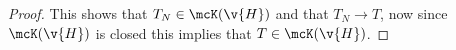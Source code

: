\documentclass[11pt, oneside]{article}
\begin{document}
\begin{enumerate}
\begin{enumerate}
\begin{proof}
          This shows that $T_N \in \mcK(\v{H})$ and that $T_N \to T$, now since
          $\mcK(\v{H})$ is closed this implies that $T \in \mcK(\v{H})$.
        \end{proof}
    \end{enumerate}
\end{enumerate}
\end{document}
